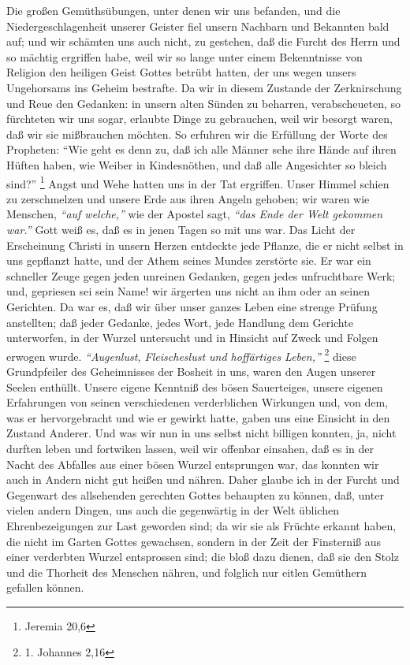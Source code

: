 Die großen Gemüthsübungen, unter denen wir uns befanden, und die
Niedergeschlagenheit unserer Geister fiel unsern Nachbarn und Bekannten bald
auf; und wir schämten uns auch nicht, zu gestehen, daß die Furcht des Herrn und
so mächtig ergriffen habe, weil wir so lange unter einem Bekenntnisse von
Religion den heiligen Geist Gottes betrübt hatten, der uns wegen unsers
Ungehorsams ins Geheim bestrafte. Da wir in diesem Zustande der Zerknirschung
und Reue den Gedanken: in unsern alten Sünden zu beharren, verabscheueten, so
fürchteten wir uns sogar, erlaubte Dinge zu gebrauchen, weil wir besorgt waren,
daß wir sie mißbrauchen möchten. So erfuhren wir die Erfüllung der Worte des
Propheten:
"`Wie geht es denn zu, daß ich alle Männer sehe ihre Hände auf ihren
Hüften haben, wie Weiber in Kindesnöthen, und daß alle Angesichter so bleich
sind?"'
\footnote{Jeremia 20,6}
Angst und Wehe hatten uns in der Tat ergriffen.
Unser Himmel schien zu zerschmelzen und unsere Erde aus ihren Angeln gehoben;
wir waren wie Menschen, \textit{"`auf welche,"'} wie der Apostel sagt, \textit{"`das Ende der Welt gekommen war."'} Gott weiß es, daß es in jenen Tagen so mit uns war. Das
Licht der Erscheinung Christi in unsern Herzen entdeckte jede Pflanze, die er
nicht selbst in uns gepflanzt hatte, und der Athem seines Mundes zerstörte sie.
Er war ein schneller Zeuge gegen jeden unreinen Gedanken, gegen jedes
unfruchtbare Werk; und, gepriesen sei sein Name! wir ärgerten uns nicht an ihm
oder an seinen Gerichten. Da war es, daß wir über unser ganzes Leben eine
strenge Prüfung anstellten; daß jeder Gedanke, jedes Wort, jede Handlung dem
Gerichte unterworfen, in der Wurzel untersucht und in Hinsicht auf Zweck und
Folgen erwogen wurde.
\textit{"`Augenlust, Fleischeslust und hoffärtiges Leben,"'}
\footnote{1. Johannes 2,16}
diese Grundpfeiler des Geheimnisses der Bosheit
in uns, waren den Augen unserer Seelen enthüllt. Unsere eigene Kenntniß des
bösen Sauerteiges, unsere eigenen Erfahrungen von seinen verschiedenen
verderblichen Wirkungen und, von dem, was er hervorgebracht und wie er gewirkt
hatte, gaben uns eine Einsicht in den Zustand Anderer. Und was wir nun in uns
selbst nicht billigen konnten, ja, nicht durften leben und fortwiken lassen, weil
wir offenbar einsahen, daß es in der Nacht des Abfalles aus einer bösen Wurzel
entsprungen war, das konnten wir auch in Andern nicht gut heißen und nähren.
Daher glaube ich in der Furcht und Gegenwart des allsehenden gerechten Gottes
behaupten zu können, daß, unter vielen andern Dingen, uns auch die gegenwärtig
in der Welt üblichen Ehrenbezeigungen zur Last geworden sind; da wir sie als
Früchte erkannt haben, die nicht im Garten Gottes gewachsen, sondern in der Zeit
der Finsterniß aus einer verderbten Wurzel entsprossen sind; die bloß dazu
dienen, daß sie den Stolz und die Thorheit des Menschen nähren, und folglich nur
eitlen Gemüthern gefallen können.

